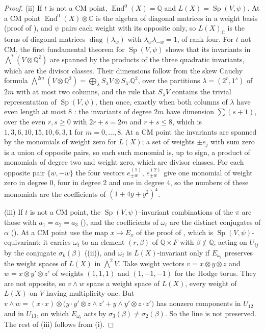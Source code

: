 \documentclass[11pt,reqno]{amsart}
\theoremstyle{plain}
\theoremstyle{definition}
\theoremstyle{remark}
\newcommand{\QQ}{\mathbb{Q}}
\newcommand{\CC}{\mathbb{C}}
\DeclareMathOperator{\End}{End}
\DeclareMathOperator{\Sp}{Sp}
\begin{document}
\begin{proof}
(ii) If $t$ is not a CM point, $\End^{0}(X)=\QQ$ and $L(X)=\Sp(V,\psi)$. At a
CM point $\End^{0}(X)\otimes\CC$ is the algebra of diagonal matrices in a
weight basis (proof of ), and $\psi$ pairs each weight
with its opposite only, so $L(X)_{\CC}$ is the torus of diagonal matrices
$\operatorname{diag}(\lambda_{w})$ with $\lambda_{w}\lambda_{-w}=1$, of rank
four. For $t$ not CM, the first fundamental theorem for $\Sp(V,\psi)$
\cite[Chapter~5]{GW09} shows that its invariants in
${\textstyle\bigwedge^{*}}(V\otimes\QQ^{2})$ are spanned by the products of
the three quadratic invariants, which are the divisor classes. Their
dimensions follow from the skew Cauchy formula
${\textstyle\bigwedge^{2m}}(V\otimes\QQ^{2})=\bigoplus_{\lambda}S_{\lambda}V
\otimes S_{\lambda'}\QQ^{2}$, over the partitions $\lambda=(2^{r},1^{s})$ of
$2m$ with at most two columns, and the rule that $S_{\lambda}V$ contains the
trivial representation of $\Sp(V,\psi)$, then once, exactly when both columns
of $\lambda$ have even length at most $8$ \cite{GW09}: the invariants of
degree $2m$ have dimension $\sum(s+1)$, over the even $r,s\ge0$ with
$2r+s=2m$ and $r+s\le8$, which is $1,3,6,10,15,10,6,3,1$ for
$m=0,\dots,8$. At a CM point the invariants are spanned by the
monomials of weight zero for $L(X)$; a set of weights $\pm e_{j}$ with sum
zero is a union of opposite pairs, so each such monomial is, up to sign, a
product of monomials of degree two and weight zero, which are divisor
classes. For each opposite pair $\{w,-w\}$ the four vectors
$e^{(1)}_{\pm w}$, $e^{(2)}_{\pm w}$ give one monomial of weight zero in
degree $0$, four in degree $2$ and one in degree $4$, so the numbers of these
monomials are the coefficients of $(1+4y+y^{2})^{4}$.

(iii) If $t$ is not a CM point, the $\Sp(V,\psi)$-invariant combinations of the
$\pi$ are those with $a_{1}=a_{2}=a_{3}$ (), and
the coefficients of $\omega_{t}$ are the distinct conjugates of $\alpha$
(). At a CM point use the map $x\mapsto E_{x}$ of the
proof of , which is $\Sp(V,\psi)$-equivariant: it
carries $\omega_{t}$ to an element $(r,\beta)$ of $\QQ\times F$ with
$\beta\notin\QQ$, acting on $U_{ij}$ by the conjugate $\sigma_{k}(\beta)$
((ii)), and $\omega_{t}$ is $L(X)$-invariant only if
$E_{\omega_{t}}$ preserves the weight spaces of $L(X)$ in ${\textstyle\bigwedge^{2}}V$. Take
weight vectors $v=x\otimes y\otimes z$ and $w=x\otimes y'\otimes z'$ of
weights $(1,1,1)$ and $(1,-1,-1)$ for the Hodge torus. They are not
opposite, so $v\wedge w$ spans a weight space of $L(X)$, every weight of
$L(X)$ on $V$ having multiplicity one. But
$v\wedge w=(x\cdot x)\otimes\bigl(y\cdot y'\otimes z\wedge z'+y\wedge y'
\otimes z\cdot z'\bigr)$ has nonzero components in $U_{12}$ and in $U_{13}$,
on which $E_{\omega_{t}}$ acts by $\sigma_{3}(\beta)\ne\sigma_{2}(\beta)$. So
the line is not preserved. The rest of (iii) follows from (i).


\end{proof}
\end{document}
